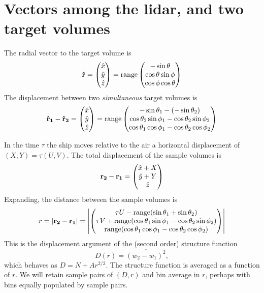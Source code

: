 \documentclass[12pt]{article}
\begin{document}
\section{Vectors among the lidar, and two target
volumes}\label{vectors-among-the-lidar-and-two-target-volumes}%

The radial vector to the target volume is \[
{\bf \hat{r}} =
\begin{pmatrix}
{\hat x} \\ 
{\hat y} \\ 
{\hat z}
\end{pmatrix}
=
{\rm range}
\begin{pmatrix}
-\sin\theta \\
 \cos\theta \sin\phi \\
 \cos\phi \cos\theta
\end{pmatrix}
\]
The displacement between two \emph{simultaneous} target volumes is \[
\bf{\hat r_1 - \hat r_2} = 
\begin{pmatrix}
{\hat x} \\
{\hat y} \\
{\hat z}
\end{pmatrix}
=
{\rm range}
\begin{pmatrix}
-\sin \theta_1-(-\sin \theta_2) \\
 \cos\theta_2 \sin \phi_1 - \cos\theta_2 \sin \phi_2 \\
 \cos\theta_1 \cos \phi_1 - \cos\theta_2 \cos\phi_2
\end{pmatrix}
\]

In the time \(\tau\) the ship moves relative to the air a horizontal
displacement of \((X, Y) = \tau(U,V)\). The total displacement of the
sample volumes is \[
{\bf r_2 - r_1} = 
\begin{pmatrix}
{\hat x} + X\\
{\hat y} + Y\\
{\hat z}
\end{pmatrix}
\] Expanding, the distance between the sample volumes is \[
r = |{\bf r_2 - r_1}| =
\left|
\begin{pmatrix}
\tau U - {\rm range}(\sin\theta_1 + \sin\theta_2) \\
\tau V + {\rm range}(\cos\theta_1 \sin\phi_1 - \cos\theta_2 \sin\phi_2) \\
  {\rm range}(\cos\theta_1 \cos\phi_1 - \cos\theta_2 \cos\phi_2)
\end{pmatrix}
\right|
\] This is the displacement argument of the (second order) structure
function \[
D(r) = \overline{(w_2-w_1)^2},
\] which behaves as \(D = N + Ar^{2/3}\). The structure function is
averaged as a function of \(r\). We will retain sample pairs of
\((D,r)\) and bin average in \(r\), perhaps with bins equally populated
by sample pairs.
\end{document}
